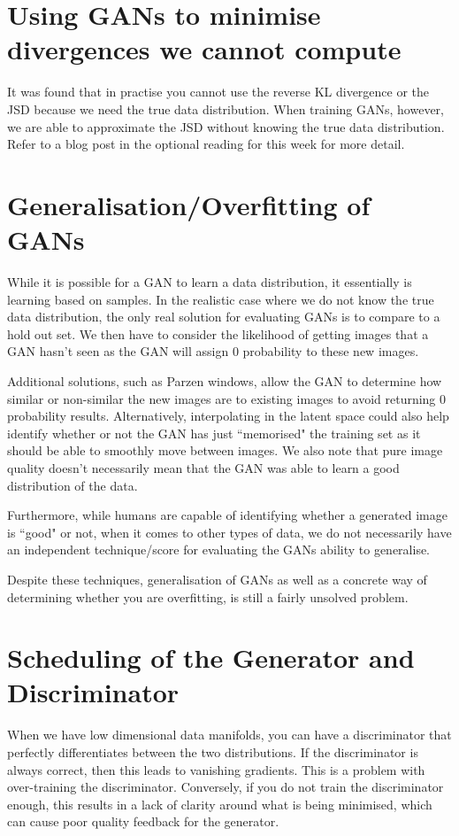 \documentclass{article}
\begin{document}
\section{Using GANs to minimise divergences we cannot compute}
It was found that in practise you cannot use the reverse KL divergence or the JSD because we need the true data distribution. When training GANs, however, we are able to approximate the JSD without knowing the true data distribution. Refer to a blog post in the optional reading for this week for more detail.

\section{Generalisation/Overfitting of GANs}
While it is possible for a GAN to learn a data distribution, it essentially is learning based on samples. In the realistic case where we do not know the true data distribution, the only real solution for evaluating GANs is to compare to a hold out set. We then have to consider the likelihood of getting images that a GAN hasn't seen as the GAN will assign 0 probability to these new images.

Additional solutions, such as Parzen windows, allow the GAN to determine how similar or non-similar the new images are to existing images to avoid returning 0 probability results. Alternatively, interpolating in the latent space could also help identify whether or not the GAN has just ``memorised" the training set as it should be able to smoothly move between images. We also note that pure image quality doesn't necessarily mean that the GAN was able to learn a good distribution of the data.

Furthermore, while humans are capable of identifying whether a generated image is ``good" or not, when it comes to other types of data, we do not necessarily have an independent technique/score for evaluating the GANs ability to generalise. 

Despite these techniques, generalisation of GANs as well as a concrete way of determining whether you are overfitting, is still a fairly unsolved problem. 

\section{Scheduling of the Generator and Discriminator}
When we have low dimensional data manifolds, you can have a discriminator that perfectly differentiates between the two distributions. If the discriminator is always correct, then this leads to vanishing gradients. This is a problem with over-training the discriminator. Conversely, if you do not train the discriminator enough, this results in a lack of clarity around what is being minimised, which can cause poor quality feedback for the generator.
\end{document}
